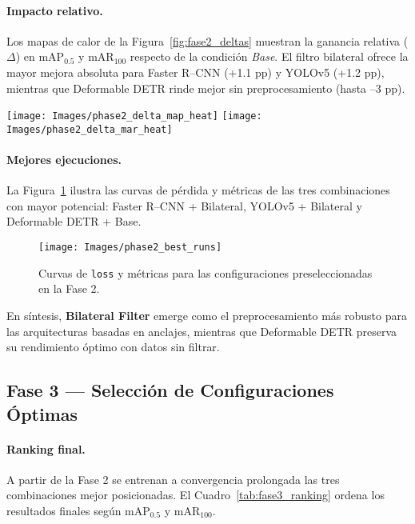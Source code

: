 \paragraph{Impacto relativo.}
Los mapas de calor de la Figura~\ref{fig:fase2_deltas} muestran la ganancia relativa (\(\Delta\)) en mAP\(_{0.5}\) y mAR\(_{100}\) respecto de la condición \textit{Base}.
El filtro bilateral ofrece la mayor mejora absoluta para Faster R–CNN (+1.1 pp) y YOLOv5 (+1.2 pp), mientras que Deformable DETR rinde mejor sin preprocesamiento (hasta –3 pp).

\begin{figure*}[!ht]
  \centering
  \texttt{[image: Images/phase2\_delta\_map\_heat]}\hfill
  \texttt{[image: Images/phase2\_delta\_mar\_heat]}
  \caption[Ganancia relativa (\(\Delta\)) en mAP y mAR]{Diferencia porcentual entre cada preprocesamiento y la línea \textit{Base}. Izquierda: mAP\(_{0.5}\); derecha: mAR\(_{100}\).}
  \label{fig:fase2_deltas}
\end{figure*}

\paragraph{Mejores ejecuciones.}
La Figura~\ref{fig:fase2_bestruns} ilustra las curvas de pérdida y métricas de las tres combinaciones con mayor potencial: Faster R–CNN + Bilateral, YOLOv5 + Bilateral y Deformable DETR + Base.

\begin{figure}[!ht]
  \centering
  \texttt{[image: Images/phase2\_best\_runs]}
  \caption[Evolución de las mejores configuraciones]{Curvas de \texttt{loss} y métricas para las configuraciones preseleccionadas en la Fase 2.}
  \label{fig:fase2_bestruns}
\end{figure}

\vspace{0.5em}
En síntesis, \textbf{Bilateral Filter} emerge como el preprocesamiento más robusto para las arquitecturas basadas en anclajes, mientras que Deformable DETR preserva su rendimiento óptimo con datos sin filtrar.

\subsection{Fase 3 — Selección de Configuraciones Óptimas}
\label{ssec:fase3}

\paragraph{Ranking final.}
A partir de la Fase 2 se entrenan a convergencia prolongada las tres combinaciones mejor posicionadas.
El Cuadro~\ref{tab:fase3_ranking} ordena los resultados finales según mAP\(_{0.5}\) y mAR\(_{100}\).


